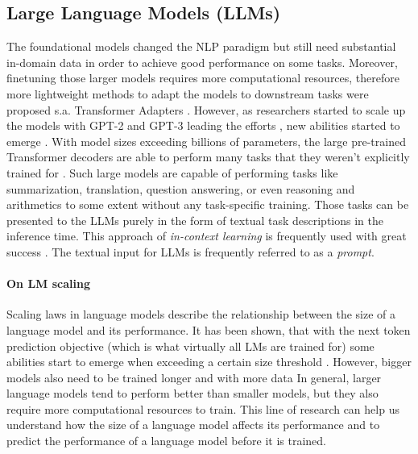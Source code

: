\subsection{Large Language Models (LLMs)}
The foundational models changed the NLP paradigm but still need substantial in-domain data in order to achieve good performance on some tasks.
Moreover, finetuning those larger models requires more computational resources, therefore more lightweight methods to adapt the models to downstream tasks were proposed s.a. Transformer Adapters \cite{pfeiffer2020AdapterHub}.
However, as researchers started to scale up the models with GPT-2 and GPT-3 leading the efforts \cite{radford2019language,brown2020language}, new abilities started to emerge \cite{wei2022emergent}.
With model sizes exceeding billions of parameters, the large pre-trained Transformer decoders are able to perform many tasks that they weren't explicitly trained for \cite{brown2020language}.
Such large models are capable of performing tasks like summarization, translation, question answering, or even reasoning and arithmetics to some extent without any task-specific training.
Those tasks can be presented to the LLMs purely in the form of textual task descriptions in the inference time.
This approach of \emph{in-context learning} is frequently used with great success \cite{min2022rethinking,dong2022survey}.
The textual input for LLMs is frequently referred to as a \emph{prompt}.

\paragraph{On LM scaling}
Scaling laws in language models describe the relationship between the size of a language model and its performance.
It has been shown, that with the next token prediction objective (which is what virtually all LMs are trained for) some abilities start to emerge when exceeding a certain size threshold \cite{kaplan2020scaling}.
However, bigger models also need to be trained longer and with more data \cite{hoffmann2022training}
In general, larger language models tend to perform better than smaller models, but they also require more computational resources to train.
This line of research can help us understand how the size of a language model affects its performance and to predict the performance of a language model before it is trained.

